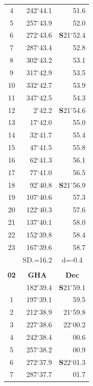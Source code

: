 \documentclass[10pt, a4paper]{report}
\begin{document}
\begin{scriptsize}
\begin{tabular*}{0.2\textwidth}[t]{@{\extracolsep{\fill}}|c|rr|}
4 & 242$^\circ$44.1 & 51.6\\
5 & 257$^\circ$43.9 & 52.0\\[2Pt]
6 & 272$^\circ$43.6 & \textbf{S}21$^\circ$52.4\\
7 & 287$^\circ$43.4 & 52.8\\
8 & 302$^\circ$43.2 & 53.1\\
9 & 317$^\circ$42.9 & \raisebox{0.24ex}{\boldmath$\cdot$~\boldmath$\cdot$~~}53.5\\
10 & 332$^\circ$42.7 & 53.9\\
11 & 347$^\circ$42.5 & 54.3\\[2Pt]
12 & 2$^\circ$42.2 & \textbf{S}21$^\circ$54.6\\
13 & 17$^\circ$42.0 & 55.0\\
14 & 32$^\circ$41.7 & 55.4\\
15 & 47$^\circ$41.5 & \raisebox{0.24ex}{\boldmath$\cdot$~\boldmath$\cdot$~~}55.8\\
16 & 62$^\circ$41.3 & 56.1\\
17 & 77$^\circ$41.0 & 56.5\\[2Pt]
18 & 92$^\circ$40.8 & \textbf{S}21$^\circ$56.9\\
19 & 107$^\circ$40.6 & 57.3\\
20 & 122$^\circ$40.3 & 57.6\\
21 & 137$^\circ$40.1 & \raisebox{0.24ex}{\boldmath$\cdot$~\boldmath$\cdot$~~}58.0\\
22 & 152$^\circ$39.8 & 58.4\\
23 & 167$^\circ$39.6 & 58.7\\
\hline
\rule{0pt}{2.4ex} & \multicolumn{1}{c}{SD.=16.2} & \multicolumn{1}{c|}{d=-0.4}\\
\hline
\multicolumn{1}{c}{}\\[-0.5ex]\hline
\multicolumn{1}{|c|}{\rule{0pt}{2.6ex}\textbf{02}} & \multicolumn{1}{c}{\textbf{GHA}} & \multicolumn{1}{c|}{\textbf{Dec}}\\
\hline\rule{0pt}{2.6ex}\noindent
0 & 182$^\circ$39.4 & \textbf{S}21$^\circ$59.1\\
1 & 197$^\circ$39.1 & 59.5\\
2 & 212$^\circ$38.9 & 21$^\circ$59.8\\
3 & 227$^\circ$38.6 & 22$^\circ$00.2\\
4 & 242$^\circ$38.4 & 00.6\\
5 & 257$^\circ$38.2 & 00.9\\[2Pt]
6 & 272$^\circ$37.9 & \textbf{S}22$^\circ$01.3\\
7 & 287$^\circ$37.7 & 01.7\\

\end{tabular*}
\end{scriptsize}
\end{document}
